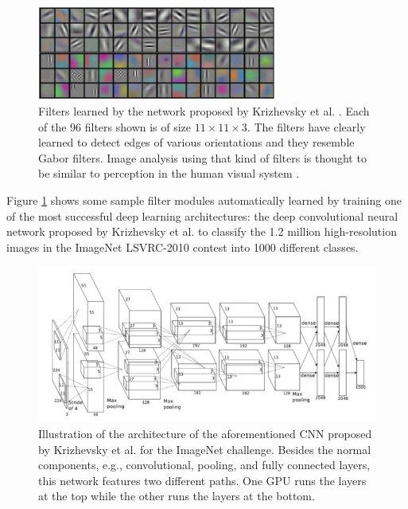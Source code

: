 \begin{figure}[!b]
	\centering
	\includegraphics[width=0.7\textwidth]{Figures/ObjRecog/weights}
	\caption{Filters learned by the network proposed by Krizhevsky et al. \cite{Krizhevsky2012}. Each of the 96 filters shown is of size $11\times11\times3$. The filters have clearly learned to detect edges of various orientations and they resemble Gabor filters. Image analysis using that kind of filters is thought to be similar to perception in the human visual system \cite{Marvcelja1980}.}
	\label{fig:alexnet_weights}
\end{figure}

Figure \ref{fig:alexnet_weights} shows some sample filter modules automatically learned by training one of the most successful deep learning architectures: the deep convolutional neural network proposed by Krizhevsky et al. \cite{Krizhevsky2012} to classify the \num{1.2} million high-resolution images in the ImageNet LSVRC-2010 \cite{Berg2010} contest into \num{1000} different classes.

\begin{figure}[!b]
	\centering
    \includegraphics[width=\linewidth]{Figures/ObjRecog/alexnet}
	\caption{Illustration of the architecture of the aforementioned \ac{CNN} proposed by Krizhevsky et al.\cite{Krizhevsky2012} for the ImageNet challenge. Besides the normal components, e.g., convolutional, pooling, and fully connected layers, this network features two different paths. One \ac{GPU} runs the layers at the top while the other runs the layers at the bottom.}
	\label{fig:convnet_architecture}
\end{figure}

